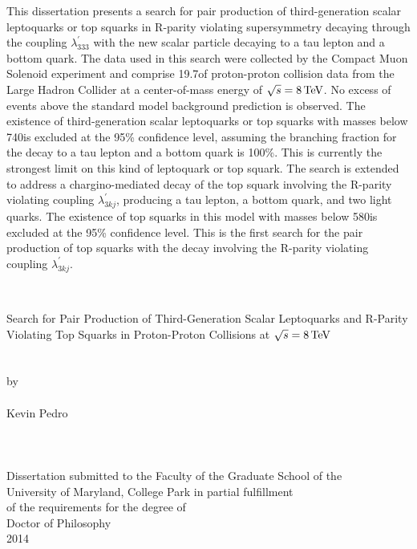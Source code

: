 \documentclass[12pt]{thesis}  %
\renewcommand{\baselinestretch}{2}
\begin{document}
This dissertation presents a search for pair production of third-generation scalar leptoquarks or top squarks in R-parity violating supersymmetry decaying through the coupling $\lambda^{\prime}_{333}$ with the new scalar particle decaying to a tau lepton and a bottom quark. The data used in this search were collected by the Compact Muon Solenoid experiment and comprise 19.7\fbinv of proton-proton collision data from the Large Hadron Collider at a center-of-mass energy of $\sqrt{s}=8\,\text{Te\hspace{-.08em}V}$. No excess of events above the standard model background prediction is observed. The existence of third-generation scalar leptoquarks or top squarks with masses below 740\GeV is excluded at the 95\% confidence level, assuming the branching fraction for the decay to a tau lepton and a bottom quark is 100\%. This is currently the strongest limit on this kind of leptoquark or top squark. The search is extended to address a chargino-mediated decay of the top squark involving the R-parity violating coupling $\lambda^{\prime}_{3kj}$, producing a tau lepton, a bottom quark, and two light quarks. The existence of top squarks in this model with masses below 580\GeV is excluded at the 95\% confidence level. This is the first search for the pair production of top squarks with the decay involving the R-parity violating coupling $\lambda^{\prime}_{3kj}$.



\thispagestyle{empty}
\hbox{\ }
\vspace{1in}
\renewcommand{\baselinestretch}{1}
\small\normalsize
\begin{center}

\large{Search for Pair Production of Third-Generation Scalar Leptoquarks and R-Parity Violating Top Squarks in Proton-Proton Collisions at $\sqrt{s} = 8\,\text{Te\hspace{-.08em}V}$}\\
\ \\
\ \\
\large{by} \\
\ \\
\large{Kevin Pedro}%
\ \\
\ \\
\ \\
\ \\
\normalsize
Dissertation submitted to the Faculty of the Graduate School of the \\
University of Maryland, College Park in partial fulfillment \\
of the requirements for the degree of \\
Doctor of Philosophy \\
2014
\end{center}
\end{document}
